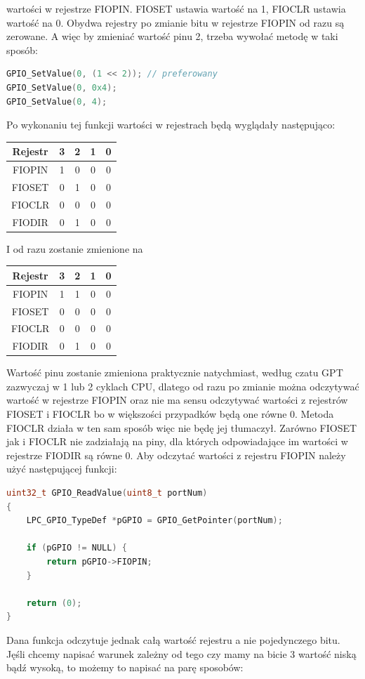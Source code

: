 \documentclass[11pt]{article}
\begin{document}
wartości w rejestrze FIOPIN. FIOSET ustawia wartość na 1, FIOCLR ustawia wartość na 0.
Obydwa rejestry po zmianie bitu w rejestrze FIOPIN od razu są zerowane. A więc by zmieniać
wartość pinu 2, trzeba wywołać metodę w taki sposób:
\begin{lstlisting}[language=c]
GPIO_SetValue(0, (1 << 2)); // preferowany
GPIO_SetValue(0, 0x4);
GPIO_SetValue(0, 4);
\end{lstlisting}
\newpage
Po wykonaniu tej funkcji wartości w rejestrach będą wyglądały następująco:
\begin{table}[H]
    \centering
    \begin{tabular}{|c|c|c|c|c|}
        \hline
        Rejestr & 3 & 2 & 1 & 0 \\ \hline
        FIOPIN & 1 & 0 & 0 & 0 \\ \hline
        FIOSET & 0 & 1 & 0 & 0 \\ \hline
        FIOCLR & 0 & 0 & 0 & 0 \\ \hline
        FIODIR & 0 & 1 & 0 & 0 \\ \hline
    \end{tabular}
\end{table}
I od razu zostanie zmienione na
\begin{table}[H]
    \centering
    \begin{tabular}{|c|c|c|c|c|}
        \hline
        Rejestr & 3 & 2 & 1 & 0 \\ \hline
        FIOPIN & 1 & 1 & 0 & 0 \\ \hline
        FIOSET & 0 & 0 & 0 & 0 \\ \hline
        FIOCLR & 0 & 0 & 0 & 0 \\ \hline
        FIODIR & 0 & 1 & 0 & 0 \\ \hline
    \end{tabular}
\end{table}
Wartość pinu zostanie zmieniona praktycznie natychmiast, według czatu GPT zazwyczaj w 1 lub 2
cyklach CPU, dlatego od razu po zmianie można odczytywać wartość w rejestrze FIOPIN oraz
nie ma sensu odczytywać wartości z rejestrów FIOSET i FIOCLR bo w większości przypadków
będą one równe 0. Metoda FIOCLR działa w ten sam sposób więc nie będę jej tłumaczył.
Zarówno FIOSET jak i FIOCLR nie zadziałają na piny, dla których odpowiadające im wartości
w rejestrze FIODIR są równe 0.
\newpage
Aby odczytać wartości z rejestru FIOPIN należy użyć następującej funkcji:
\begin{lstlisting}[language=c]
uint32_t GPIO_ReadValue(uint8_t portNum)
{
	LPC_GPIO_TypeDef *pGPIO = GPIO_GetPointer(portNum);

	if (pGPIO != NULL) {
		return pGPIO->FIOPIN;
	}

	return (0);
}
\end{lstlisting}
Dana funkcja odczytuje jednak całą wartość rejestru a nie pojedynczego bitu.
Jęśli chcemy napisać warunek zależny od tego czy mamy na bicie 3 wartość niską bądź
wysoką, to możemy to napisać na parę sposobów:
\end{document}
